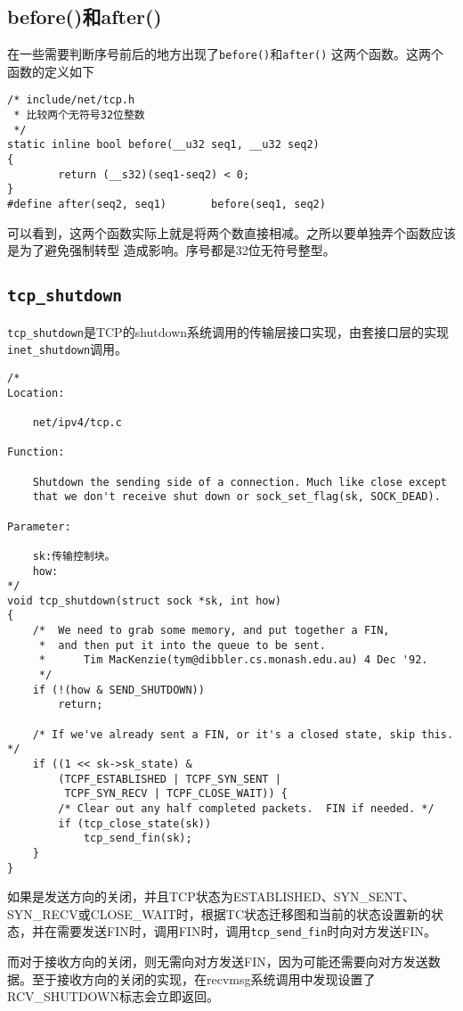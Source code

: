 \subsection{before()和after()}
在一些需要判断序号前后的地方出现了\texttt{before()}和\texttt{after()}
这两个函数。这两个函数的定义如下
\begin{verbatim}
/* include/net/tcp.h
 * 比较两个无符号32位整数
 */
static inline bool before(__u32 seq1, __u32 seq2)
{
        return (__s32)(seq1-seq2) < 0;
}
#define after(seq2, seq1)       before(seq1, seq2)
\end{verbatim}
可以看到，这两个函数实际上就是将两个数直接相减。之所以要单独弄个函数应该是为了避免强制转型
造成影响。序号都是32位无符号整型。

	\subsection{\texttt{tcp_shutdown}}

		\texttt{tcp_shutdown}是TCP的shutdown系统调用的传输层接口实现，由套接口层的实现\texttt{inet_shutdown}调用。
\begin{verbatim}
/*
Location:

	net/ipv4/tcp.c

Function:
	
	Shutdown the sending side of a connection. Much like close except
	that we don't receive shut down or sock_set_flag(sk, SOCK_DEAD).

Parameter:

	sk:传输控制块。
	how:
*/
void tcp_shutdown(struct sock *sk, int how)
{
	/*	We need to grab some memory, and put together a FIN,
	 *	and then put it into the queue to be sent.
	 *		Tim MacKenzie(tym@dibbler.cs.monash.edu.au) 4 Dec '92.
	 */
	if (!(how & SEND_SHUTDOWN))
		return;

	/* If we've already sent a FIN, or it's a closed state, skip this. */
	if ((1 << sk->sk_state) &
	    (TCPF_ESTABLISHED | TCPF_SYN_SENT |
	     TCPF_SYN_RECV | TCPF_CLOSE_WAIT)) {
		/* Clear out any half completed packets.  FIN if needed. */
		if (tcp_close_state(sk))
			tcp_send_fin(sk);
	}
}
\end{verbatim}
		如果是发送方向的关闭，并且TCP状态为ESTABLISHED、SYN\_SENT、SYN\_RECV或CLOSE\_WAIT时，根据TC状态迁移图和当前的状态设置新的状态，并在需要发送FIN时，调用FIN时，调用\texttt{tcp_send_fin}时向对方发送FIN。

		而对于接收方向的关闭，则无需向对方发送FIN，因为可能还需要向对方发送数据。至于接收方向的关闭的实现，在recvmsg系统调用中发现设置了RCV\_SHUTDOWN标志会立即返回。

